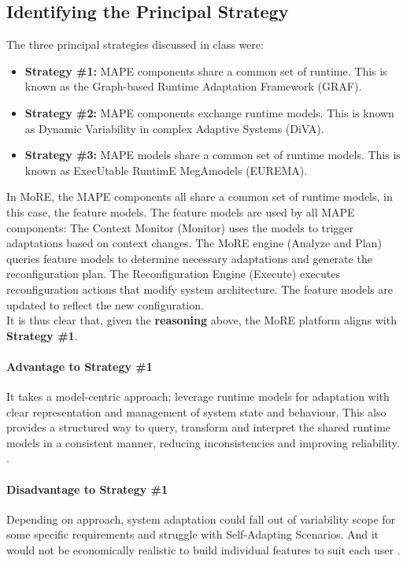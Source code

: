 \documentclass[conference]{IEEEtran}
\begin{document}
\subsection{\textbf{Identifying the Principal Strategy}}
The three principal strategies discussed in class were:\\

\begin{itemize}
	\item \textbf{Strategy \#1:} MAPE components share a common set of runtime. This is known as the Graph-based Runtime Adaptation Framework (GRAF).
	\item \textbf{Strategy \#2:} MAPE components exchange runtime models. This is known as Dynamic Variability in complex Adaptive Systems (DiVA).
	\item \textbf{Strategy \#3:} MAPE models share a common set of runtime models. This is known as ExecUtable RuntimE MegAmodels (EUREMA).\\
\end{itemize}

In MoRE, the MAPE components all share a common set of runtime models, in this case, the feature models. The feature models are used by all MAPE components: The Context Monitor (Monitor) uses the models to trigger adaptations based on context changes. The MoRE engine (Analyze and Plan) queries feature models to determine necessary adaptations and generate the reconfiguration plan. The Reconfiguration Engine (Execute) executes reconfiguration actions that modify system architecture. The feature models are updated to reflect the new configuration.\\

It is thus clear that, given the \textbf{reasoning} above, the MoRE platform aligns with \textbf{Strategy \#1}.\\

\paragraph{Advantage to Strategy \#1} It takes a model-centric approach; leverage runtime models for adaptation with clear representation and management of system state and behaviour. This also provides a structured way to query, transform and interpret the shared runtime models in a consistent manner, reducing inconsistencies and improving reliability. \cite{lecture6_pdf}.\\

\paragraph{Disadvantage to Strategy \#1} Depending on approach, system adaptation could fall out of variability scope for some specific requirements and struggle with Self-Adapting Scenarios. And it would not be economically realistic to build individual features to suit each user \cite{MORE_pdf}.
\end{document}
